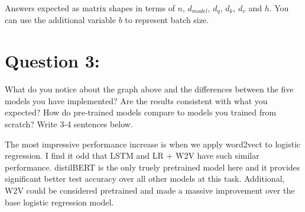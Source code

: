 \documentclass{article}
\begin{document}
Answers expected as matrix shapes in terms of $n$, $d_{model}$, $d_q$, $d_k$, $d_v$ and $h$. You can use the additional variable $b$ to represent batch size.


\section*{Question 3:}

What do you notice about the graph above and the differences between the five models you have implemented? Are the results consistent with what you expected? How do pre-trained models compare to models you trained from scratch? Write 3-4 sentences below.

The most impressive performance increase is when we apply word2vect to logistic regression. I find it odd that LSTM and LR + W2V have such similar performance. distilBERT is the only truely pretrained model here and it provides significant better test accuracy over all other models at this task. Additional, W2V could be considered pretrained and made a massive improvement over the base logistic regression model.  
\end{document}
